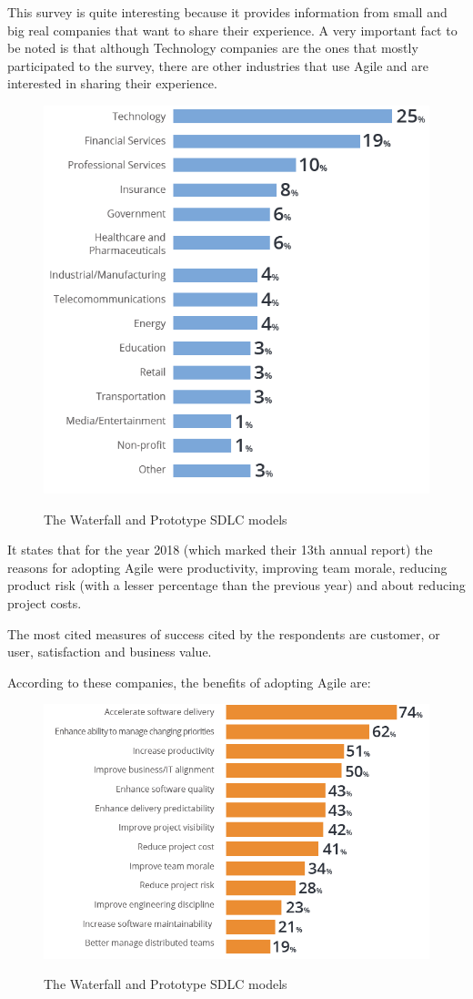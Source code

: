 	This survey is quite interesting because it provides information from small and big real companies that want to share their experience.
	A very important fact to be noted is that although Technology companies are the ones that mostly participated to the survey, there are other industries that use Agile and are interested in sharing their experience.

	\begin{figure}[H]
		\centering
		\includegraphics[width=.8\textwidth]{resources/Untitled_2}\\
		\caption{The Waterfall and Prototype SDLC models}
	\end{figure}

	It states that for the year 2018 (which marked their 13th annual report) the reasons for adopting Agile were productivity, improving team morale, reducing product risk (with a lesser percentage than the previous year) and about reducing project costs.

	The most cited measures of success cited by the respondents are customer, or user, satisfaction and business value.

	According to these companies, the benefits of adopting Agile are:
	\begin{figure}[H]
		\centering
		\includegraphics[width=.8\textwidth]{resources/Untitled}\\
		\caption{The Waterfall and Prototype SDLC models}
	\end{figure}

